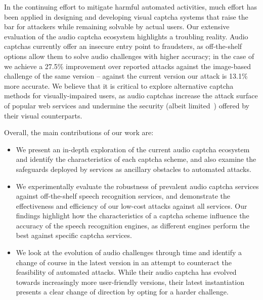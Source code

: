 In the continuing effort to mitigate harmful automated activities, much effort has been applied in 
designing and developing visual captcha systems that raise the bar for attackers while remaining 
solvable by actual users. Our extensive evaluation of the audio captcha ecosystem highlights
a troubling reality. Audio captchas currently offer an insecure entry point to fraudsters,
as off-the-shelf options allow them to solve audio challenges with higher accuracy; in the case of \re
we achieve a 27.5\% improvement over reported attacks against the image-based challenge of the same version --
against the current version our attack is 13.1\% more accurate.
We believe that it is critical to explore alternative captcha methods for visually-impaired users,
as audio captchas increase the attack surface of popular web services and undermine the security
(albeit limited~\cite{185128,sivakorn:eurosp16}) offered by their visual counterparts.

Overall, the main contributions of our work are:

\begin{itemize}

\item We present an in-depth exploration of the current audio captcha ecosystem and identify the characteristics 
of each captcha scheme, and also examine the safeguards deployed by services as ancillary obstacles to automated
attacks.

\item We experimentally evaluate the robustness of prevalent audio captcha services against
off-the-shelf speech recognition services, and demonstrate the effectiveness and efficiency 
of our low-cost attacks against all services. Our findings highlight how the characteristics 
of a captcha scheme influence the accuracy of the speech recognition engines, as different
engines perform the best against specific captcha services.

\item We look at the evolution of \re audio challenges through time
 and identify a change of course in the latest version %
 in an attempt to counteract the feasibility of automated attacks. While 
 their audio captcha has evolved towards increasingly more user-friendly versions,
 their latest instantiation presents a clear change of direction by 
 opting for a harder challenge.


\end{itemize}
